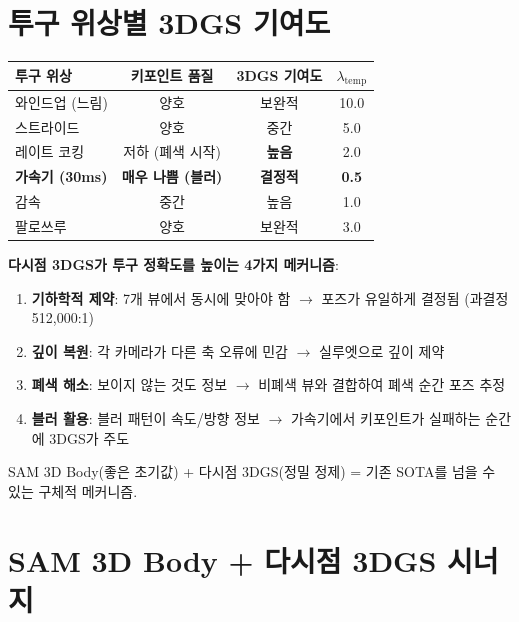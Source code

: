 \documentclass[11pt, a4paper]{report}
\begin{document}
\section{투구 위상별 3DGS 기여도}

\begin{center}
\renewcommand{\arraystretch}{1.3}
\begin{tabular}{lccc}
\toprule
\textbf{투구 위상} & \textbf{키포인트 품질} & \textbf{3DGS 기여도} & $\lambda_{\text{temp}}$ \\
\midrule
와인드업 (느림) & 양호 & 보완적 & 10.0 \\
스트라이드 & 양호 & 중간 & 5.0 \\
레이트 코킹 & 저하 (폐색 시작) & \textbf{높음} & 2.0 \\
\textbf{가속기 (30ms)} & \textbf{매우 나쁨 (블러)} & \textbf{결정적} & \textbf{0.5} \\
감속 & 중간 & 높음 & 1.0 \\
팔로쓰루 & 양호 & 보완적 & 3.0 \\
\bottomrule
\end{tabular}
\end{center}

\begin{summary}
\textbf{다시점 3DGS가 투구 정확도를 높이는 4가지 메커니즘}:
\begin{enumerate}
\item \textbf{기하학적 제약}: 7개 뷰에서 동시에 맞아야 함 $\to$ 포즈가 유일하게 결정됨 (과결정 512,000:1)
\item \textbf{깊이 복원}: 각 카메라가 다른 축 오류에 민감 $\to$ 실루엣으로 깊이 제약
\item \textbf{폐색 해소}: 보이지 않는 것도 정보 $\to$ 비폐색 뷰와 결합하여 폐색 순간 포즈 추정
\item \textbf{블러 활용}: 블러 패턴이 속도/방향 정보 $\to$ 가속기에서 키포인트가 실패하는 순간에 3DGS가 주도
\end{enumerate}
SAM 3D Body(좋은 초기값) + 다시점 3DGS(정밀 정제) = 기존 SOTA를 넘을 수 있는 구체적 메커니즘.
\end{summary}


\section{SAM 3D Body + 다시점 3DGS 시너지}
\end{document}
